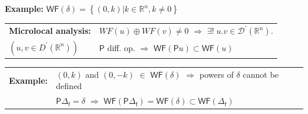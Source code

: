 \documentclass[9pt]{beamer}
\newcommand{\WF}{\mathsf{WF}} %
\newcommand{\Rbb}{\mathbb{R}}
\newcommand{\Psf}{\mathsf{P}}
\newcommand{\fsf}{\mathsf{f}}
\begin{document}
\begin{frame}[label=details_wf]
\begin{block}{\vspace*{-3ex}}
\end{block}

\textbf{Example:} $\WF(\delta) = \left\{ (0,k) | k \in \Rbb^n , k \neq 0 \right\} $ 

\vspace*{-12pt}

\begin{block}{\vspace*{-3ex}}
\vspace*{-1pt}
\begin{tabular}{ll}
\textbf{Microlocal analysis:} &%
$WF(u) \oplus WF(v) \neq 0$ $\Rightarrow$ $\exists! \; u.v \in \mathcal{D}^{\prime}(\mathbb{R}^n).$ \\
$\left(u,v \in D^\prime(\mathbb{R}^n)\right)$ & $\Psf$ diff. op. $\Rightarrow$ $\WF(\Psf u) \subset \WF(u)$
\end{tabular}



\end{block}

\begin{tabular}{ll}
\hspace*{-6pt}\textbf{Example:} & $(0,k)$ and $(0,-k)$ $\in$ $\WF(\delta)$ $\Rightarrow$ powers of $\delta$ cannot be defined \\
 & $\Psf \Delta_\fsf = \delta$ $\Rightarrow$ $\WF(\Psf \Delta_\fsf) = \WF(\delta) \subset \WF(\Delta_\fsf)$
\end{tabular}






\hfill \hyperlink{wf}{}

\end{frame}

\end{document}
